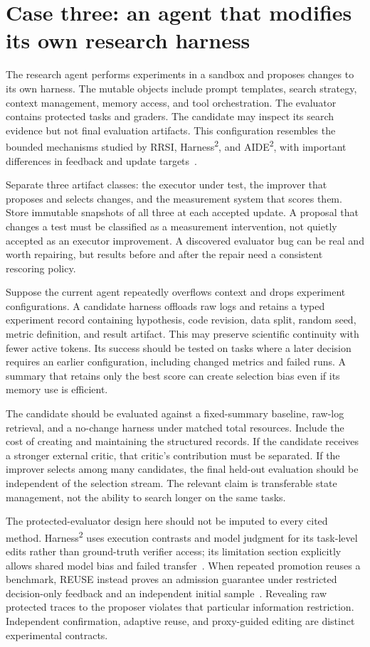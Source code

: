\section{Case three: an agent that modifies its own research harness}\label{sec:C33:06}
The research agent performs experiments in a sandbox and proposes changes to its own harness. The mutable objects include prompt templates, search strategy, context management, memory access, and tool orchestration. The evaluator contains protected tasks and graders. The candidate may inspect its search evidence but not final evaluation artifacts. This configuration resembles the bounded mechanisms studied by RRSI, Harness\textsuperscript{2}, and AIDE\textsuperscript{2}, with important differences in feedback and update targets~\cite{rrsi2026,corpus261014224,root_aide2026}.

Separate three artifact classes: the executor under test, the improver that proposes and selects changes, and the measurement system that scores them. Store immutable snapshots of all three at each accepted update. A proposal that changes a test must be classified as a measurement intervention, not quietly accepted as an executor improvement. A discovered evaluator bug can be real and worth repairing, but results before and after the repair need a consistent rescoring policy.

Suppose the current agent repeatedly overflows context and drops experiment configurations. A candidate harness offloads raw logs and retains a typed experiment record containing hypothesis, code revision, data split, random seed, metric definition, and result artifact. This may preserve scientific continuity with fewer active tokens. Its success should be tested on tasks where a later decision requires an earlier configuration, including changed metrics and failed runs. A summary that retains only the best score can create selection bias even if its memory use is efficient.

The candidate should be evaluated against a fixed-summary baseline, raw-log retrieval, and a no-change harness under matched total resources. Include the cost of creating and maintaining the structured records. If the candidate receives a stronger external critic, that critic's contribution must be separated. If the improver selects among many candidates, the final held-out evaluation should be independent of the selection stream. The relevant claim is transferable state management, not the ability to search longer on the same tasks.

The protected-evaluator design here should not be imputed to every cited method. Harness\textsuperscript{2} uses execution contrasts and model judgment for its task-level edits rather than ground-truth verifier access; its limitation section explicitly allows shared model bias and failed transfer~\cite{corpus261014224}. When repeated promotion reuses a benchmark, REUSE instead proves an admission guarantee under restricted decision-only feedback and an independent initial sample~\cite{ch02_reuse2026}. Revealing raw protected traces to the proposer violates that particular information restriction. Independent confirmation, adaptive reuse, and proxy-guided editing are distinct experimental contracts.

